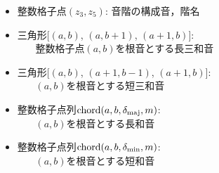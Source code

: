 \begin{itemize}
\item 整数格子点$(z_3, z_5)$: 音階の構成音，階名
\item 三角形$\bigl[(a,b)$, $(a,b+1)$, $(a+1,b)\bigr]$:\\
~~~ 整数格子点$(a,b)$を根音とする長三和音
\item 三角形$\bigl[(a,b)$, $(a+1,b-1)$, $(a+1,b)\bigr]$:\\
~~~ $(a,b)$を根音とする短三和音
\item 整数格子点列$\mathrm{chord}(a,b,\delta_{\rm maj},m)$:\\
~~~ $(a,b)$を根音とする長和音
\item 整数格子点列$\mathrm{chord}(a,b,\delta_{\rm min},m)$:\\
~~~ $(a,b)$を根音とする短和音
\end{itemize}

